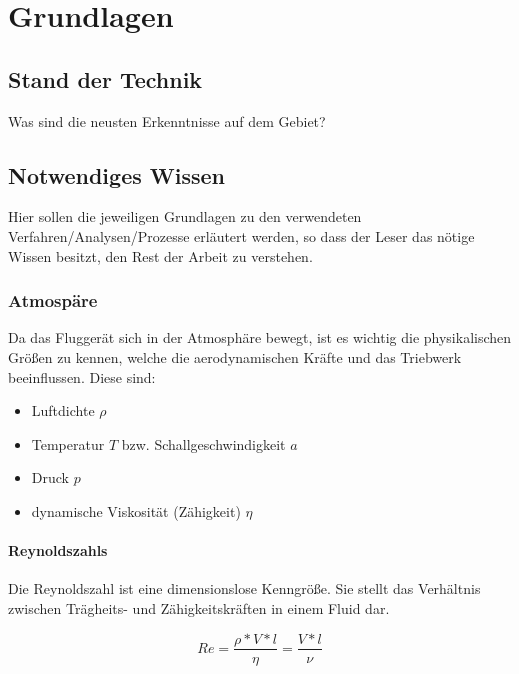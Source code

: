 \chapter{Grundlagen}
\label{chap2:grundlagen}
\section{Stand der Technik}
\label{sec:sdt}
Was sind die neusten Erkenntnisse auf dem Gebiet?

\section{Notwendiges Wissen}
\label{sec:wissen}
Hier sollen die jeweiligen Grundlagen zu den verwendeten Verfahren/Analysen/Prozesse erläutert werden, so dass der Leser das nötige Wissen besitzt, den Rest der Arbeit zu verstehen.



\subsection{Atmospäre}
\label{subsec:atmosphere}

Da das Fluggerät sich in der Atmosphäre bewegt, ist es wichtig die physikalischen Größen zu kennen, welche die aerodynamischen Kräfte und das Triebwerk beeinflussen. Diese sind:
\begin{itemize}
\item{Luftdichte $\rho$}
\item{Temperatur $T$ bzw. Schallgeschwindigkeit $a$}
\item{Druck $p$}
\item{dynamische Viskosität (Zähigkeit) $\eta$}
\end{itemize}



\subsubsection{Reynoldszahls}
\label{rezahl}

Die Reynoldszahl ist eine dimensionslose Kenngröße. Sie stellt das Verhältnis zwischen Trägheits- und Zähigkeitskräften in einem Fluid dar.

\begin{equation}
Re = \frac{\rho * V * l}{\eta} = \frac{V * l}{\nu}
\end{equation}

